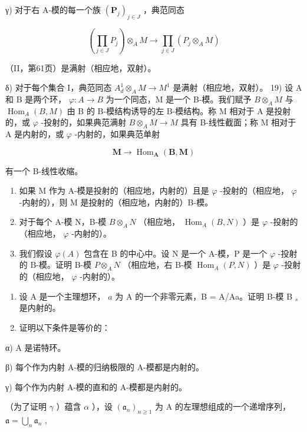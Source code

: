 γ) 对于右 A-模的每一个族 \((\mathbf{P}_{j})_{j\in J}\) ，典范同态

\[
\left(\prod_ {j \in J} P _ {j}\right) \otimes_ {A} M \rightarrow \prod_ {j \in J} \left(P _ {j} \otimes_ {A} M\right)
\]

（II，第61页）是满射（相应地，双射）。

δ) 对于每个集合 I，典范同态 \(A_{d}^{1} \otimes_{A} M \to M^{1}\) 是满射（相应地，双射）。 19) 设 A 和 B 是两个环， \(\varphi : A \to B\) 为一个同态，M 是一个 B-模。我们赋予 \(B \otimes_{A} M\) 与 \(\operatorname{Hom}_{A}(B, M)\) 由 B 的 B-模结构诱导的左 B-模结构。称 M 相对于 A 是投射的，或 \(\varphi\) -投射的，如果典范满射 \(B \otimes_{A} M \to M\) 具有 B-线性截面；称 M 相对于 A 是内射的，或 \(\varphi\) -内射的，如果典范单射

\[
\mathbf {M} \rightarrow \operatorname{Hom} _ {\mathbf {A}} (\mathbf {B}, \mathbf {M})
\]

有一个 B-线性收缩。

\begin{enumerate}
\def\labelenumi{\alph{enumi})}
\item
  如果 M 作为 A-模是投射的（相应地，内射的）且是 \(\varphi\) -投射的（相应地， \(\varphi\) -内射的），则 M 是投射的（相应地，内射的）B-模。
\item
  对于每个 A-模 N，B-模 \(B \otimes_{A} N\) （相应地， \(\operatorname{Hom}_{A}(B, N)\) ）是 \(\varphi\) -投射的（相应地， \(\varphi\) -内射的）。
\item
  我们假设 \(\varphi(A)\) 包含在 B 的中心中。设 N 是一个 A-模，P 是一个 \(\varphi\) -投射的 B-模。证明 B-模 \(P \otimes_{A} N\) （相应地，右 B-模 \(\operatorname{Hom}_{A}(P, N)\) ）是 \(\varphi\) -投射的（相应地， \(\varphi\) -内射的）。
\end{enumerate}

\begin{enumerate}
\def\labelenumi{\arabic{enumi})}
\setcounter{enumi}{19}
\item
  设 A 是一个主理想环， \(a\) 为 A 的一个非零元素，B = A/Aa。证明 B-模 B \(_{s}\) 是内射的。
\item
  证明以下条件是等价的：
\end{enumerate}

α) A 是诺特环。

β) 每个作为内射 A-模的归纳极限的 A-模都是内射的。

γ) 每个作为内射 A-模的直和的 A-模都是内射的。

（为了证明 \(\gamma\) ）蕴含 \(\alpha\) ），设 \((\mathfrak{a}_n)_{n\geqslant 1}\) 为 A 的左理想组成的一个递增序列， \(\mathfrak{a} = \bigcup_{n}\mathfrak{a}_{n}\) ,

